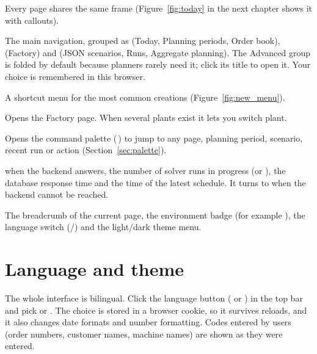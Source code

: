 Every page shares the same frame (Figure~\ref{fig:today} in the next chapter shows it with callouts).

\begin{description}[style=nextline, leftmargin=1.2em, font=\bfseries\color{brand}]
  \item[Sidebar (left)] The main navigation, grouped as  (Today, Planning periods, Order
        book),  (Factory) and  (JSON scenarios, Runs, Aggregate planning).
        The Advanced group is folded by default because planners rarely need it; click its title to open it.
        Your choice is remembered in this browser.
  \item[New button] A shortcut menu for the most common creations (Figure~\ref{fig:new_menu}).
  \item[Factory name] Opens the Factory page. When several plants exist it lets you switch plant.
  \item[Quick search] Opens the command palette (\,) to jump to any page, planning
        period, scenario, recent run or action (Section~\ref{sec:palette}).
  \item[Status box (bottom left)]  when the backend answers, the number of solver runs in
        progress (or ), the database response time and the time of the latest schedule.
        It turns to  when the backend cannot be reached.
  \item[Top bar] The breadcrumb of the current page, the environment badge (for example
        ), the language switch (/) and the light/dark theme menu.
\end{description}


\section{Language and theme}

The whole interface is bilingual. Click the language button ( or ) in the top bar and pick
 or . The choice is stored in a browser cookie, so it survives reloads, and it
also changes date formats and number formatting. Codes entered by users (order numbers, customer names,
machine names) are shown as they were entered.

